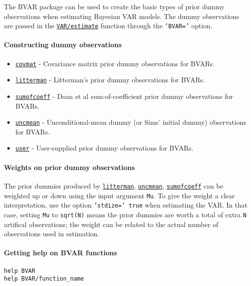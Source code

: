 

	The BVAR package can be used to create the basic types of prior dummy
observations when estimating Bayesian VAR models. The dummy observations
are passed in the \href{VAR/estimate}{\texttt{VAR/estimate}} function
through the \texttt{'BVAR='} option.

\paragraph{Constructing dummy
observations}

\begin{itemize}
\itemsep1pt\parskip0pt
\item
  \href{BVAR/covmat}{\texttt{covmat}} - Covariance matrix prior dummy
  observations for BVARs.
\item
  \href{BVAR/litterman}{\texttt{litterman}} - Litterman's prior dummy
  observations for BVARs.
\item
  \href{BVAR/sumofcoeff}{\texttt{sumofcoeff}} - Doan et al
  sum-of-coefficient prior dummy observations for BVARs.
\item
  \href{BVAR/uncmean}{\texttt{uncmean}} - Unconditional-mean dummy (or
  Sims' initial dummy) observations for BVARs.
\item
  \href{BVAR/user}{\texttt{user}} - User-supplied prior dummy
  observations for BVARs.
\end{itemize}

\paragraph{Weights on prior dummy
observations}

The prior dummies produced by \href{BVAR/litterman}{\texttt{litterman}},
\href{BVAR/uncmean}{\texttt{uncmean}},
\href{BVAR/sumofcoeff}{\texttt{sumofcoeff}} can be weighted up or down
using the input argument \texttt{Mu}. To give the weight a clear
interpretation, use the option \texttt{'stdize=' true} when estimating
the VAR. In that case, setting \texttt{Mu} to \texttt{sqrt(N)} means the
prior dummies are worth a total of extra \texttt{N} artifical
observations; the weight can be related to the actual number of
observations used in estimation.

\paragraph{Getting help on BVAR
functions}

\begin{verbatim}
help BVAR
help BVAR/function_name
\end{verbatim}



